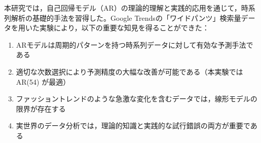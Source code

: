 \documentclass[12pt]{article}
\begin{document}
本研究では，自己回帰モデル（AR）の理論的理解と実践的応用を通じて，時系列解析の基礎的手法を習得した。Google Trendsの「ワイドパンツ」検索量データを用いた実験により，以下の重要な知見を得ることができた：

\begin{enumerate}
\item ARモデルは周期的パターンを持つ時系列データに対して有効な予測手法である
\item 適切な次数選択により予測精度の大幅な改善が可能である（本実験では AR(54) が最適）
\item ファッショントレンドのような急激な変化を含むデータでは，線形モデルの限界が存在する
\item 実世界のデータ分析では，理論的知識と実践的な試行錯誤の両方が重要である
\end{enumerate}
\end{document}
